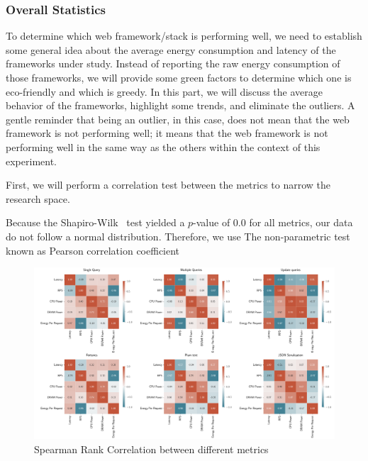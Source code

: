 \subsubsection{Overall Statistics}

To determine which web framework/stack is performing well, we need to establish some general idea about the average energy consumption and latency of the frameworks under study.
Instead of reporting the raw energy consumption of those frameworks, we will provide some green factors to determine which one is eco-friendly and which is greedy.
In this part, we will discuss the average behavior of the frameworks, highlight some trends, and eliminate the outliers.
A gentle reminder that being an outlier, in this case, does not mean that the web framework is not performing well; it means that the web framework is not performing well in the same way as the others within the context of this experiment.

First, we will perform a correlation test between the metrics to narrow the research space.

Because the Shapiro-Wilk~\cite{shapiro1968comparative} test yielded a $p$-value of 0.0 for all metrics, our data do not follow a normal distribution. Therefore, we use The non-parametric test known as Pearson correlation coefficient~\cite{zar2005spearman}

\begin{figure}[!h]
    \centering
    \includegraphics[width=\textwidth]{imgs/correlation_all}
    \caption{Spearman Rank Correlation between different metrics}
    \label{fig:correlation}
\end{figure}

